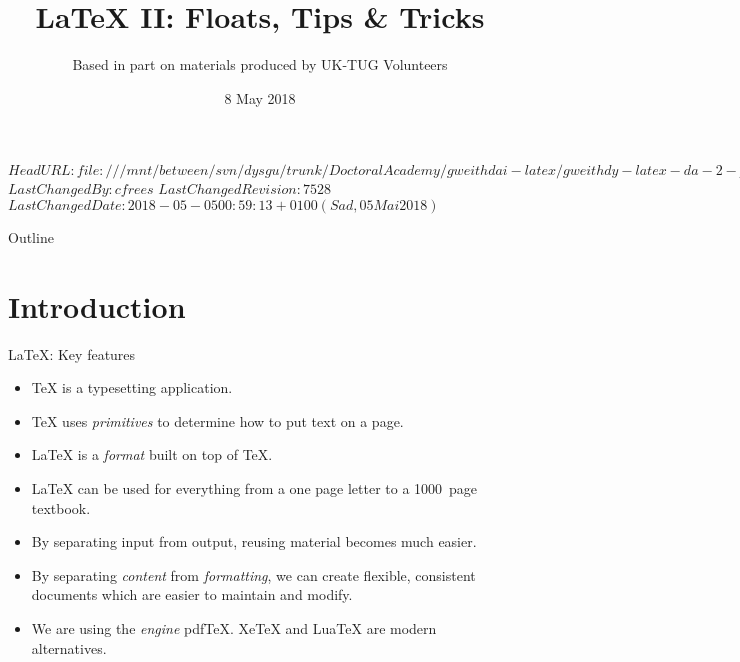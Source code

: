 \svnidlong
{$HeadURL: file:///mnt/between/svn/dysgu/trunk/DoctoralAcademy/gweithdai-latex/gweithdy-latex-da-2-pellach/training.tex $}
{$LastChangedBy: cfrees $}
{$LastChangedRevision: 7528 $}
{$LastChangedDate: 2018-05-05 00:59:13 +0100 (Sad, 05 Mai 2018) $}

\usepackage[citestyle=authoryear-comp,bibstyle=authoryear,mergedate=basic,isbn=false,url=true,sortcites=true,backend=biber,mincrossrefs=6]{biblatex}




{
  \usetikzlibrary{quotes,automata,positioning,bending,shadows,shapes.arrows}
  \usepackage{tikz-cd}
}


\title{\LaTeX{} II: Floats, Tips \& Tricks}
\subtitle{Based in part on materials produced by UK-TUG Volunteers}
\date{ 8 May 2018}




\begin{frame}
  \titlepage
\end{frame}

\maketitle


\tableofcontents

%
{
  \begin{frame}{Outline}
	\tableofcontents
  \end{frame}
}

%

\section{Introduction}

\begin{frame}{\LaTeX{}: Key features}

  \begin{itemize}
	\item \TeX{} is a typesetting application.
	\item \TeX{} uses \emph{primitives} to determine how to put text on a page.
	\item \LaTeX{} is  a \emph{format} built on top of \TeX{}.
	\item \LaTeX{} can be used for everything from a one page letter to a 1000~page textbook.
	\item By separating input from output, reusing material becomes much easier.
	\item By separating \emph{content} from \emph{formatting}, we can create flexible, consistent documents which are easier to maintain and modify.
	\item We are using the \emph{engine} pdf\TeX{}.
	Xe\TeX{} and Lua\TeX{} are modern alternatives.
  \end{itemize}

\end{frame}

